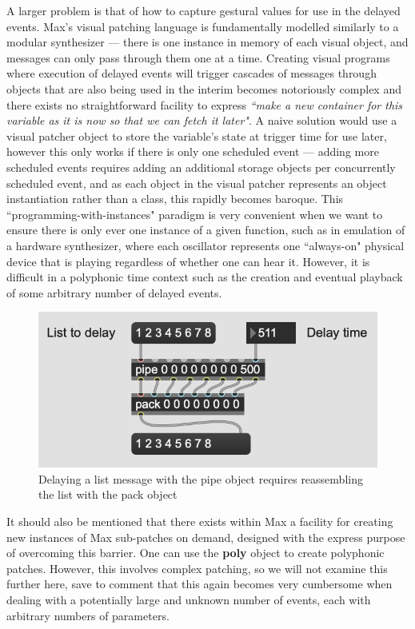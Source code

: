 \documentclass[acmsmall, anonymous, review]{acmart}
\begin{document}
A larger problem is that of how to capture gestural values for use in the delayed
events. Max's visual patching language is fundamentally modelled similarly to a modular
synthesizer --- there is one instance in memory of each visual object, and messages can only
pass through them one at a time. Creating visual programs where execution of 
delayed events will trigger cascades of messages through objects that are also 
being used in the interim becomes notoriously complex and there exists no straightforward
facility to express \textit{``make a new container for this variable as it is now so that
we can fetch it later"}. A naive solution would use a visual patcher object to store 
the variable's state at trigger time for use later, however this only works
if there is only one scheduled event --- adding more scheduled events requires adding
an additional storage objects per concurrently scheduled event, and as each object in the visual patcher
represents an object instantiation rather than a class, this rapidly becomes
baroque. This ``programming-with-instances" paradigm
is very convenient when we want to ensure there is only ever one instance of a given function, such
as in emulation of a hardware synthesizer, where each oscillator represents one ``always-on"
physical device that is playing regardless of whether one can hear it. 
However, it is difficult in a polyphonic time context
such as the creation and eventual playback of some arbitrary number of delayed events.

\begin{figure}[H]
  \centering
  \includegraphics[width=.5\linewidth]{fig-5-pipe}
  \caption{Delaying a list message with the pipe object requires reassembling the list with the pack object}
\end{figure}

It should also be mentioned that there exists within Max a facility for creating
new instances of Max sub-patches on demand, designed with the express purpose of
overcoming this barrier. One can use the \textbf{poly} object to create polyphonic
patches. However, this involves complex patching, so we will not examine this further here,
save to comment that this again becomes very cumbersome when dealing
with a potentially large and unknown number of events, each with arbitrary numbers
of parameters.
\end{document}
